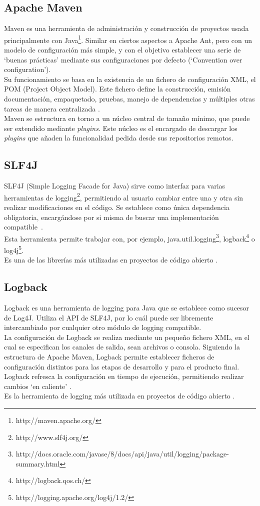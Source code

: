 \subsection{Apache Maven}
Maven es una herramienta de administración y construcción de proyectos usada principalmente con Java\footnote{http://maven.apache.org/}.
Similar en ciertos aspectos a Apache Ant, pero con un modelo de configuración más simple, y con el objetivo establecer una serie de `buenas prácticas' mediante sus configuraciones por defecto (`Convention over configuration').
\\
Su funcionamiento se basa en la existencia de un fichero de configuración XML, el POM (Project Object Model).
Este fichero define la construcción, emisión documentación, empaquetado, pruebas, manejo de dependencias y múltiples otras tareas de manera centralizada \cite{mvnEx}.
\\
Maven se estructura en torno a un núcleo central de tamaño mínimo, que puede ser extendido mediante \emph{plugins}.
Este núcleo es el encargado de descargar los \emph{plugins} que añaden la funcionalidad pedida desde sus repositorios remotos.

\subsection{SLF4J}
SLF4J (Simple Logging Facade for Java) sirve como interfaz para varias herramientas de logging\footnote{http://www.slf4j.org/}, permitiendo al usuario cambiar entre una y otra sin realizar modificaciones en el código.
Se establece como única dependencia obligatoria, encargándose por si misma de buscar una implementación compatible~\cite{website:slf4j}.
\\
Esta herramienta permite trabajar con, por ejemplo, java.util.logging\footnote{http://docs.oracle.com/javase/8/docs/api/java/util/logging/package-summary.html}, logback\footnote{http://logback.qos.ch/} o log4j\footnote{http://logging.apache.org/log4j/1.2/}.
\\
Es una de las librerías más utilizadas en proyectos de código abierto \cite{website:githubTOP}.

\subsection{Logback}
Logback es una herramienta de logging para Java que se establece como sucesor de Log4J.
Utiliza el API de SLF4J, por lo cuál puede ser libremente intercambiado por cualquier otro módulo de logging compatible.
\\
La configuración de Logback se realiza mediante un pequeño fichero XML, en el cual se especifican los canales de salida, sean archivos o consola.
Siguiendo la estructura de Apache Maven, Logback permite establecer ficheros de configuración distintos para las etapas de desarrollo y para el producto final.
Logback refresca la configuración en tiempo de ejecución, permitiendo realizar cambios `en caliente' \cite{website:logback}.
\\
Es la herramienta de logging más utilizada en proyectos de código abierto \cite{website:githubTOP}.

